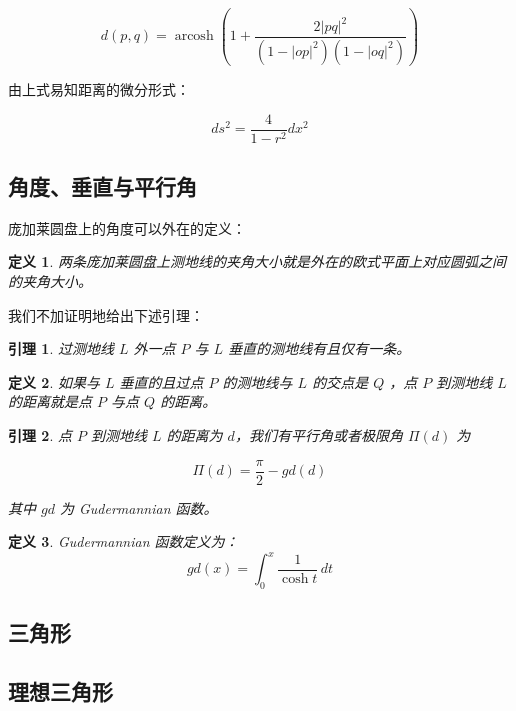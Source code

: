 \documentclass[a4paper,12pt]{article}
\newtheorem{definition}{定义}
\newtheorem{lemma}{引理}
\begin{document}
$$d(p,q) = \operatorname{arcosh} \left( 1 + \frac{2 |pq|^2}{(1-|op|^2)(1-|oq|^2)} \right) $$

由上式易知距离的微分形式：

$$ ds^2 = \frac{4}{1 - r^2} dx^2 $$

\newpage

\subsection{角度、垂直与平行角}

庞加莱圆盘上的角度可以外在的定义：

\begin{definition}
\label{d3}
两条庞加莱圆盘上测地线的夹角大小就是外在的欧式平面上对应圆弧之间的夹角大小。
\end{definition}

我们不加证明地给出下述引理：

\begin{lemma}
\label{l2}
过测地线 $L$ 外一点 $P$ 与 $L$ 垂直的测地线有且仅有一条。
\end{lemma}

\begin{definition}
\label{d4}
如果与 $L$ 垂直的且过点 $P$ 的测地线与 $L$ 的交点是 $Q$ ，点 $P$ 到测地线 $L$ 的距离就是点 $P$ 与点 $Q$ 的距离。
\end{definition}

\begin{lemma}
\label{l3}
点 $P$ 到测地线 $L$ 的距离为 $d$，我们有平行角或者极限角 $ \Pi(d) $ 为

$$ \Pi(d) =  \frac{\pi}{2} - gd(d) $$

其中 $gd$ 为 Gudermannian 函数。
\end{lemma}

\begin{definition}
\label{d5}
Gudermannian 函数定义为：
$$ gd(x)=\int_0^x\frac{1}{\cosh t} \, dt $$
\end{definition}


\newpage

\subsection{三角形}

\newpage

\subsection{理想三角形}
\end{document}
